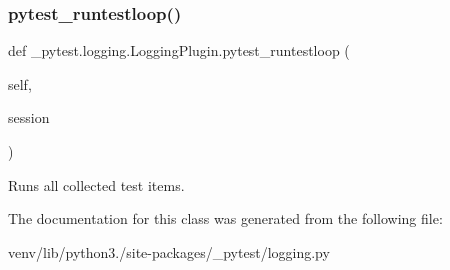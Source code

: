 \subsubsection{\texorpdfstring{pytest\+\_\+runtestloop()}{pytest\_runtestloop()}}
{\footnotesize\ttfamily def \+\_\+pytest.\+logging.\+Logging\+Plugin.\+pytest\+\_\+runtestloop (\begin{DoxyParamCaption}\item[{}]{self,  }\item[{}]{session }\end{DoxyParamCaption})}

\begin{DoxyVerb}Runs all collected test items.\end{DoxyVerb}
 

The documentation for this class was generated from the following file\+:\begin{DoxyCompactItemize}
\item 
venv/lib/python3./site-\/packages/\+\_\+pytest/logging.\+py\end{DoxyCompactItemize}
